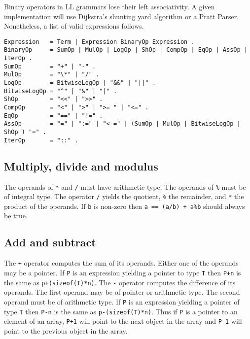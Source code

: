 Binary operators in LL grammars lose their left associativity. A given
implementation will use Dijkstra's shunting yard algorithm or a Pratt
Parser. Nonetheless, a list of valid expressions follows.

\begin{lstlisting}
Expression   = Term | Expression BinaryOp Expression .
BinaryOp     = SumOp | MulOp | LogOp | ShOp | CompOp | EqOp | AssOp | IterOp .
SumOp        = "+" | "-" .
MulOp        = "\*" | "/" .
LogOp        = BitwiseLogOp | "&&" | "||" .
BitwiseLogOp = "^" | "&" | "|" .
ShOp         = "<<" | ">>" .
CompOp       = "<" | ">" | ">= " | "<=" .
EqOp         = "==" | "!=" . 
AssOp        = "=" | ":=" | "<-=" | (SumOp | MulOp | BitwiseLogOp | ShOp ) "=" .
IterOp       = "::" .
\end{lstlisting}

\hypertarget{multiply-divide-and-modulus}{%
\subsection{Multiply, divide and
modulus}\label{multiply-divide-and-modulus}}

The operands of \passthrough{\lstinline!*!} and
\passthrough{\lstinline!/!} must have arithmetic type. The operands of
\passthrough{\lstinline!\%!} must be of integral type. The operator
\passthrough{\lstinline!/!} yields the quotient,
\passthrough{\lstinline!\%!} the remainder, and
\passthrough{\lstinline!*!} the product of the operands. If
\passthrough{\lstinline!b!} is non-zero then
\passthrough{\lstinline!a == (a/b) + a\%b!} should always be true.

\hypertarget{add-and-subtract}{%
\subsection{Add and subtract}\label{add-and-subtract}}

The \passthrough{\lstinline!+!} operator computes the sum of its
operands. Either one of the operands may be a pointer. If
\passthrough{\lstinline!P!} is an expression yielding a pointer to type
\passthrough{\lstinline!T!} then \passthrough{\lstinline!P+n!} is the
same as \passthrough{\lstinline!p+(sizeof(T)*n)!}. The
\passthrough{\lstinline!-!} operator computes the difference of its
operands. The first operand may be of pointer or arithmetic type. The
second operand must be of arithmetic type. If
\passthrough{\lstinline!P!} is an expression yielding a pointer of type
\passthrough{\lstinline!T!} then \passthrough{\lstinline!P-n!} is the
same as \passthrough{\lstinline!p-(sizeof(T)*n)!}. Thus if
\passthrough{\lstinline!P!} is a pointer to an element of an array,
\passthrough{\lstinline!P+1!} will point to the next object in the array
and \passthrough{\lstinline!P-1!} will point to the previous object in
the array.

